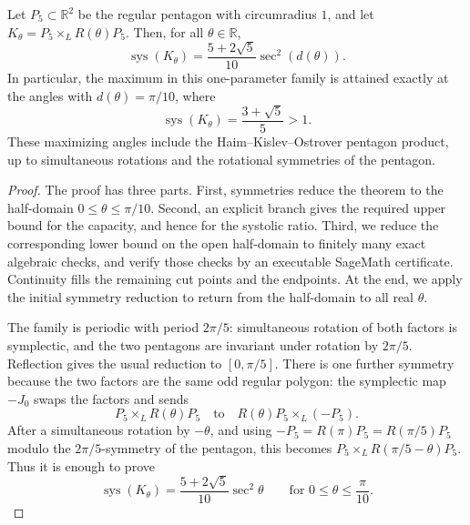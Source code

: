 \begin{theorem}
\label{thm:rotated-pentagon-product-formula}
Let \(P_5\subset\mathbb{R}^2\) be the regular pentagon with circumradius \(1\),
and let \(K_\theta=P_5\times_L R(\theta)P_5\). Then, for all
\(\theta\in\mathbb{R}\),
\[
  \operatorname{sys}(K_\theta)
  =
  \frac{5+2\sqrt{5}}{10}\sec^2(d(\theta)).
\]
In particular, the maximum in this one-parameter family is attained exactly at
the angles with \(d(\theta)=\pi/10\), where
\[
  \operatorname{sys}(K_\theta)=\frac{3+\sqrt{5}}{5}>1.
\]
These maximizing angles include the Haim--Kislev--Ostrover pentagon product,
up to simultaneous rotations and the rotational symmetries of the pentagon.
\end{theorem}

\begin{proof}
The proof has three parts. First, symmetries reduce the theorem to the
half-domain \(0\le\theta\le\pi/10\). Second, an explicit branch gives the
required upper bound for the capacity, and hence for the systolic ratio. Third,
we reduce the corresponding lower bound on the open half-domain to finitely
many exact algebraic checks, and verify those checks by an executable SageMath
certificate. Continuity fills the remaining cut points and the endpoints. At
the end, we apply the initial symmetry reduction to return from the half-domain
to all real \(\theta\).

The family is periodic with period \(2\pi/5\): simultaneous rotation of both
factors is symplectic, and the two pentagons are invariant under rotation by
\(2\pi/5\). Reflection gives the usual reduction to
\([0,\pi/5]\). There is one further symmetry because the two factors are the
same odd regular polygon: the symplectic map \(-J_0\) swaps the factors and
sends
\[
  P_5\times_L R(\theta)P_5
  \quad\text{to}\quad
  R(\theta)P_5\times_L(-P_5).
\]
After a simultaneous rotation by \(-\theta\), and using
\(-P_5=R(\pi)P_5=R(\pi/5)P_5\) modulo the \(2\pi/5\)-symmetry of the pentagon,
this becomes \(P_5\times_L R(\pi/5-\theta)P_5\). Thus it is enough to prove
\[
  \operatorname{sys}(K_\theta)
  =
  \frac{5+2\sqrt{5}}{10}\sec^2\theta
  \qquad
  \text{for }0\le\theta\le\frac{\pi}{10}.
\]


\end{proof}
